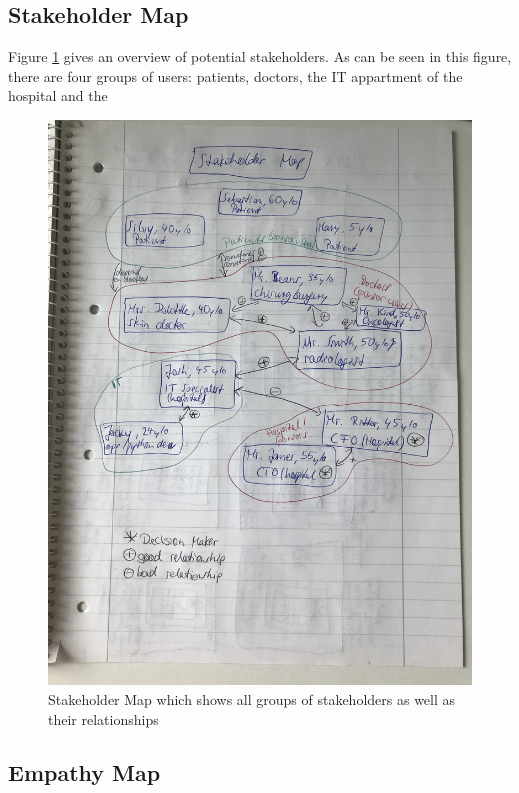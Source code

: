 \subsection{Stakeholder Map}

Figure \ref{stakeholdermap} gives an overview of potential stakeholders. As can be seen in this figure, there are four groups of users: patients, doctors, the IT appartment of the hospital and the 

\begin{figure}[h!]
	\centering
	\includegraphics[width=1\textwidth]{images/stakeholdermap.jpg}
	\caption{Stakeholder Map which shows all groups of stakeholders as well as their relationships}
	\label{stakeholdermap}
\end{figure}

\subsection{Empathy Map}


